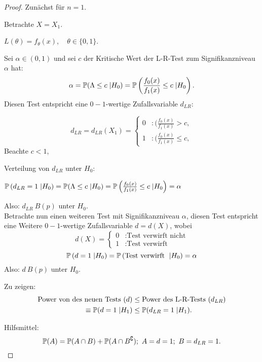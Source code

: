 \documentclass{tstextbook}
\begin{document}
\begin{proof}
	Zunächst für $ n=1 $. 
	
	Betrachte $ X=X_1 $. 
	
	$ L(\theta)=f_\theta(x), \quad \theta\in\{0,1\} $. 
	
	Sei $ \alpha\in(0,1) $ und sei $ c $ der Kritische Wert der L-R-Test zum Signifikanzniveau $ \alpha $ hat: \\
	\[
	\alpha = \mathbb P(\Lambda\le c\;|H_0) = \mathbb P\left(\frac{f_0(x)}{f_1(x)}\le c \;|H_0\right).
	\]
	Diesen  Test entspricht eine $ 0-1 $-wertige Zufallsvariable $ d_{LR} \colon $
	
	\[
	d_{LR}= d_{LR}(X_1)=\left\{\begin{array}{ll}
		0 & \colon (\frac{f_0(x)}{f_1(x)} > c, \\
		1 & \colon (\frac{f_0(x)}{f_1(x)}\le c,
	\end{array}\right.
	\]
	Beachte $c<1$,

	Verteilung von $d_{LR}$ unter $H_0$:
	
	 $ \mathbb P\left(d_{LR}=1\;|H_0\right)=  \mathbb P(\Lambda\le c\;|H_0) = \mathbb P\left(\frac{f_0(x)}{f_1(x)}\le c \;|H_0\right)  =\alpha $
	 
	 Also: $d_{LR} ~ B(p)$ unter $H_0$. \\
	 
	
	Betrachte nun einen weiteren Test mit Signifikanzniveau $ \alpha $, diesen Test entspricht eine Weitere $ 0-1 $-wertige Zufallsvariable $ d=d(X) $, wobei 
	\[
	d(X)=\left\{\begin{array}{ll}
		0 & \colon \text{Test verwirft nicht} \\
		1 & \colon \text{Test verwirft}
	\end{array}\right.
	\]
	\[  \mathbb P\left(d=1\;|H_0\right)=\mathbb P\left(\text{Test verwirft } \;|H_0\right) = \alpha \]
	 Also: $d ~ B(p)$ unter $H_0$. 
	
	Zu zeigen: 
	\[
	\begin{aligned}
		\text{Power von des neuen Tests } ( d ) & \le \text{Power des L-R-Tests } (d_{LR}) \\
		\equiv \mathbb P(d=1\;|H_1) & \le \mathbb P(d_{LR}=1\;|H_1).
	\end{aligned}
	\]
	
	Hilfsmittel: 
	\[
	\mathbb P(A) = \mathbb P(A\cap B) +\mathbb P(A\cap B^\complement); \ A={d=1}; \ B={d_{LR}=1}.
	\]
	

\end{proof}
\end{document}
